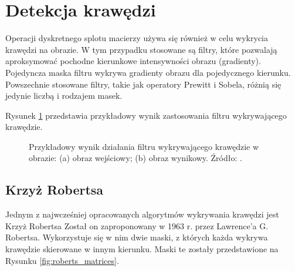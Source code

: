 \documentclass[a4paper,twocolumn,12pt]{article}
\begin{document}
\section{Detekcja krawędzi} \label{sec:edge_detection}

Operacji dyskretnego splotu macierzy używa się również w celu wykrycia krawędzi na obrazie.
W tym przypadku stosowane są filtry, które pozwalają aproksymować pochodne kierunkowe intensywności obrazu (gradienty).
Pojedyncza maska filtru wykrywa gradienty obrazu dla pojedycznego kierunku.
Powszechnie stosowane filtry, takie jak operatory Prewitt i Sobela, różnią się jedynie liczbą i rodzajem masek.

Rysunek \ref{fig:edges_example} przedstawia przykładowy wynik zastosowania filtru wykrywającego krawędzie.

\begin{figure}[!ht]
 \begin{center}
 \end{center}
 \caption{
  Przykładowy wynik działania filtru wykrywającego krawędzie w obrazie:
  (a) obraz wejściowy;
  (b) obraz wynikowy.
  Źródło: \cite{roberts}.
 }
 \label{fig:edges_example}
\end{figure}


\subsection{Krzyż Robertsa}

Jednym z najwcześniej opracowanych algorytmów wykrywania krawędzi jest Krzyż Robertsa
Został on zaproponowany w 1963 r. przez Lawrence’a G. Robertsa.
Wykorzystuje się w nim dwie maski, z których każda wykrywa krawędzie skierowane w innym kierunku.
Maski te zostały przedstawione na Rysunku \ref{fig:roberts_matrices}.
\end{document}
